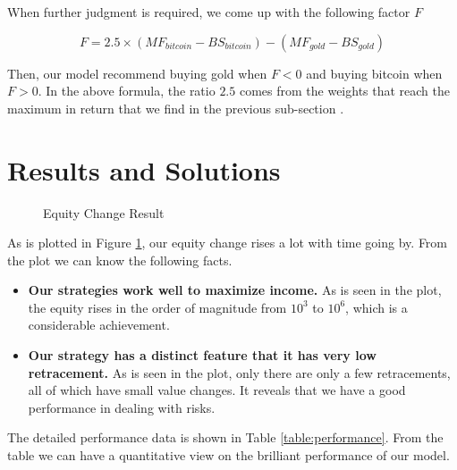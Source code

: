 \documentclass[12pt,a4paper]{article}
\begin{document}
\begin{spacing}{1.2}
When further judgment is required, we come up with the following factor $F$ 

$$
F=2.5 \times (MF_{bitcoin}-BS_{bitcoin})-(MF_{gold}-BS_{gold})
$$

Then, our model recommend buying gold when $F<0$ and buying bitcoin when $F>0$. In the above formula, the ratio $2.5$ comes from the weights that reach the maximum in return that we find in the previous sub-section .

\section{Results and Solutions}
\label{Results_Solutions}

\begin{figure}[H]
	\caption{Equity Change Result}
	\label{figure:equity_change}
\end{figure}

As is plotted in Figure \ref{figure:equity_change}, our equity change rises a lot with time going by. From the plot we can know the following facts.

\begin{itemize}
	\item \textbf{Our strategies work well to maximize income.} As is seen in the plot, the equity rises in the order of magnitude from $10^3$ to $10^6$, which is a considerable achievement.
	
	\item \textbf{Our strategy has a distinct feature that it has very low retracement.} As is seen in the plot, only there are only a few retracements, all of which have small value changes. It reveals that we have a good performance in dealing with risks.
\end{itemize}

The detailed performance data is shown in Table \ref{table:performance}. From the table we can have a quantitative view on the brilliant performance of our model.


\end{spacing}
\end{document}

